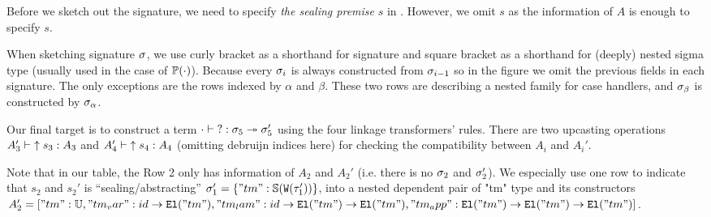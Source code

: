 Before we sketch out the signature, we need to specify \textit{the sealing premise} $s$ in . However, we omit $s$ as the information of $A$ is enough to specify $s$.

When sketching signature $\sigma$, we use curly bracket as a shorthand for signature and square bracket as a shorthand for (deeply) nested sigma type (usually used in the case of $\mathbb{P}({\cdot})$). Because every $\sigma_i$ is always constructed from $\sigma_{i-1}$ so in the figure we omit the previous fields in each signature.  The only exceptions are the rows indexed by $\alpha$ and $\beta$. These two rows are describing a nested family for case handlers, and $\sigma_\beta$ is constructed by $\sigma_\alpha$. 


Our final target is to construct a term $ {\cdot} \vdash {?} : {\sigma_5} \twoheadrightarrow {\ensuremath{\sigma}_5'}$ using the four linkage transformers' rules. There are two upcasting operations $ {A_3'} \vdash {\uparrow s_3} : {A_3} $ and $ {A_4'} \vdash {\uparrow s_4} : {A_4} $ (omitting debruijn indices here) for checking the compatibility between $A_i$ and $A_i'$.

Note that in our table, the Row 2 only has information of $A_2$ and $A_2'$ (i.e. there is no $\sigma_2$ and $\sigma_2'$). We especially use one row to indicate that $s_2$ and $s_2'$ is ``sealing/abstracting'' $\sigma_1' = \{"tm" : \mathbb{S}({\texttt{W}({\tau_1'})})\}$, into a nested dependent pair of "tm" type and its constructors $A_2' = ["tm" : \mathbb{U}, "tm_var" : id \to \texttt{El}({"tm"}), "tm_lam" : id \to \texttt{El}({"tm"}) \to \texttt{El}({"tm"}), "tm_app" : \texttt{El}({"tm"}) \to \texttt{El}({"tm"}) \to \texttt{El}({"tm"})]$.